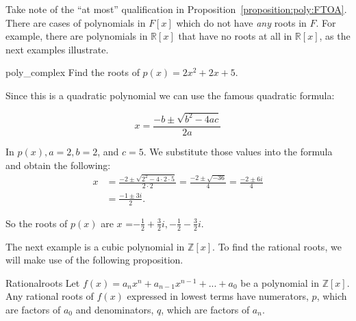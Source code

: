 Take note of the ``at most'' qualification in Proposition~\ref{proposition:poly:FTOA}. There are cases of polynomials in $F[x]$ which do not have  \emph{any} roots in $F$. For example, there are polynomials in $\mathbb{R}[x]$ that have no roots at all in $\mathbb{R}[x]$, as the next examples illustrate.

\begin{example}{poly_complex} 
Find the roots of $p(x)=2x^2+2x+5$.

Since this is a quadratic polynomial we can use the famous quadratic formula:

$$x=\frac {-b \pm \sqrt{b^2-4ac}}{2a}$$

In $p(x), a=2, b=2$, and $c=5.$ We substitute those values into the formula and obtain the following:
\begin{align*}
x&=\frac {-2 \pm \sqrt{2^2-4\cdot 2\cdot 5}}{2\cdot 2}=\frac {-2 \pm \sqrt{-36}}{4}=\frac {-2 \pm 6i}{4}\\
&=\frac {-1 \pm 3i}{2}.
\end{align*}

So the roots of $p(x)$ are $x$ ={$-\frac{1}{2}+\frac{3}{2}i, -\frac{1}{2}-\frac{3}{2}i$}.
\end{example}

The next example is a cubic polynomial in $\mathbb{Z}[x]$. To find the rational roots, we will make use of the following proposition.

\begin{prop}{Rationalroots}
Let $f(x) = a_{n}x^n+a_{n-1}x^{n-1}+...+a_{0}$ be a polynomial in $\mathbb{Z}[x]$. Any rational roots of $f(x)$ expressed in lowest terms have numerators, $p$, which are factors of $a_{0}$ and denominators, $q$, which are factors of $a_{n}$.
\end {prop}

